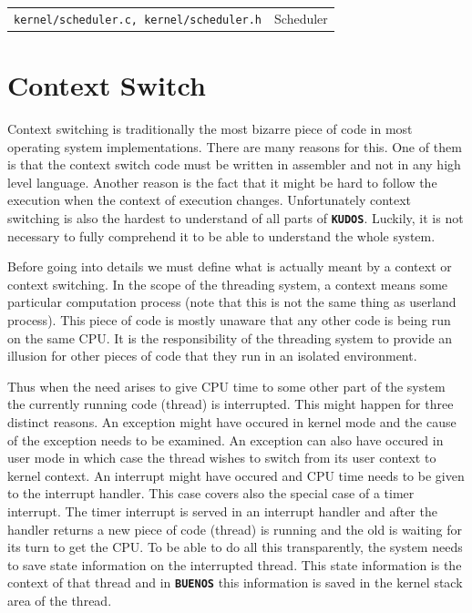 \documentclass[twoside,a4paper]{report}
\newcommand{\PBS}[1]{\let\temp=\\#1\let\\=\temp}
\newlength{\tablewidth}
\newcommand{\buenos}{\texttt{\textbf{BUENOS}}}
\newcommand{\kudos}{\texttt{\textbf{KUDOS}}}
\newenvironment{filelist}[0]{%
\vspace{\baselineskip}%
\begin{center}%
\begin{tabular}{p{4cm}>{\PBS\raggedright}p{\tablewidth-4\tabcolsep-4cm}}%
\hline%
}{%
\end{tabular}%
\end{center}%
}
\newcommand{\file}[2]{\texttt{#1} \vspace{2mm} & #2 \vspace{2mm}\\}
\begin{document}
\begin{filelist}
\file{kernel/scheduler.c, kernel/scheduler.h}{Scheduler}
\end{filelist}


\section{Context Switch}

Context switching is traditionally the most bizarre piece of code in
most operating system implementations. There are many reasons for
this. One of them is that the context switch code must be written in
assembler and not in any high level language. Another reason is the
fact that it might be hard to follow the execution when the context of
execution changes. Unfortunately context switching is also the hardest
to understand of all parts of \kudos{}. Luckily, it is not necessary
to fully comprehend it to be able to understand the whole system.

Before going into details we must define what is actually meant by a
context or context switching. In the scope of the threading system, a
context means some particular computation process (note that this is
not the same thing as userland process). This piece of code is mostly
unaware that any other code is being run on the same CPU. It is the
responsibility of the threading system to provide an illusion for
other pieces of code that they run in an isolated environment.

Thus when the need arises to give CPU time to some other part of the
system the currently running code (thread) is interrupted. This might
happen for three distinct reasons. An exception might have occured in
kernel mode and the cause of the exception needs to be examined. An
exception can also have occured in user mode in which case the thread
wishes to switch from its user context to kernel context. An interrupt
might have occured and CPU time needs to be given to the interrupt
handler. This case covers also the special case of a timer interrupt.
The timer interrupt is served in an interrupt handler and after the
handler returns a new piece of code (thread) is running and the old is
waiting for its turn to get the CPU. To be able to do all this
transparently, the system needs to save state information on the
interrupted thread. This state information is the context of that
thread and in \buenos{} this information is saved in the kernel stack
area of the thread.
\end{document}
